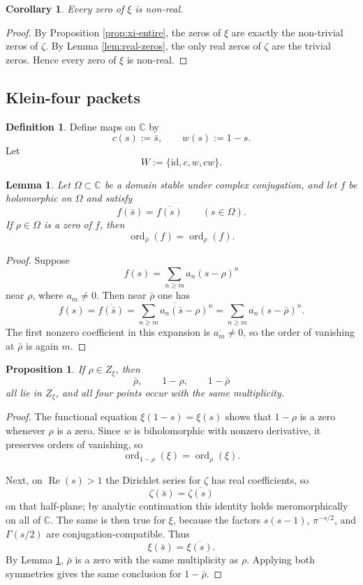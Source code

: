 \documentclass[11pt,a4paper]{article}
\newtheorem{proposition}[theorem]{Proposition}
\newtheorem{lemma}[theorem]{Lemma}
\newtheorem{corollary}[theorem]{Corollary}
\theoremstyle{definition}
\newtheorem{definition}[theorem]{Definition}
\theoremstyle{remark}
\DeclareMathOperator{\ord}{ord}
\DeclareMathOperator{\Rea}{Re}
\newcommand{\CC}{\mathbb C}
\begin{document}
\begin{corollary}\label{cor:nonreal}
Every zero of $\xi$ is non-real.
\end{corollary}

\begin{proof}
By Proposition \ref{prop:xi-entire}, the zeros of $\xi$ are exactly the non-trivial zeros of $\zeta$.  By Lemma \ref{lem:real-zeros}, the only real zeros of $\zeta$ are the trivial zeros.  Hence every zero of $\xi$ is non-real.
\end{proof}

\subsection{Klein-four packets}

\begin{definition}
Define maps on $\CC$ by
\[
c(s):=\bar s,
\qquad
w(s):=1-s.
\]
Let
\[
W:=\{\mathrm{id},c,w,cw\}.
\]
\end{definition}

\begin{lemma}\label{lem:conjugate-order}
Let $\Omega\subset\CC$ be a domain stable under complex conjugation, and let $f$ be holomorphic on $\Omega$ and satisfy
\[
f(\bar s)=\overline{f(s)}
\qquad (s\in \Omega).
\]
If $\rho\in\Omega$ is a zero of $f$, then
\[
\ord_{\bar\rho}(f)=\ord_\rho(f).
\]
\end{lemma}

\begin{proof}
Suppose
\[
f(s)=\sum_{n\ge m} a_n (s-\rho)^n
\]
near $\rho$, where $a_m\ne 0$.  Then near $\bar\rho$ one has
\[
f(s)=\overline{f(\bar s)}=
\overline{\sum_{n\ge m} a_n (\bar s-\rho)^n}
=
\sum_{n\ge m} \overline{a_n}(s-\bar\rho)^n.
\]
The first nonzero coefficient in this expansion is $\overline{a_m}\ne 0$, so the order of vanishing at $\bar\rho$ is again $m$.
\end{proof}

\begin{proposition}\label{prop:packet-symmetry}
If $\rho\in Z_\xi$, then
\[
\bar\rho,\qquad 1-\rho,\qquad 1-\bar\rho
\]
all lie in $Z_\xi$, and all four points occur with the same multiplicity.
\end{proposition}

\begin{proof}
The functional equation $\xi(1-s)=\xi(s)$ shows that $1-\rho$ is a zero whenever $\rho$ is a zero.  Since $w$ is biholomorphic with nonzero derivative, it preserves orders of vanishing, so
\[
\ord_{1-\rho}(\xi)=\ord_\rho(\xi).
\]

Next, on $\Rea(s)>1$ the Dirichlet series for $\zeta$ has real coefficients, so
\[
\zeta(\bar s)=\overline{\zeta(s)}
\]
on that half-plane; by analytic continuation this identity holds meromorphically on all of $\CC$.  The same is then true for $\xi$, because the factors $s(s-1)$, $\pi^{-s/2}$, and $\Gamma(s/2)$ are conjugation-compatible.  Thus
\[
\xi(\bar s)=\overline{\xi(s)}.
\]
By Lemma \ref{lem:conjugate-order}, $\bar\rho$ is a zero with the same multiplicity as $\rho$.  Applying both symmetries gives the same conclusion for $1-\bar\rho$.
\end{proof}
\end{document}
